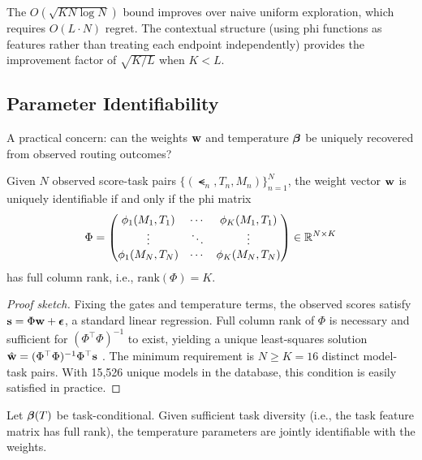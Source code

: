 \begin{remark}
The $O(\sqrt{KN\log N})$ bound improves over naive uniform exploration, which requires $O(L \cdot N)$ regret. The contextual structure (using phi functions as features rather than treating each endpoint independently) provides the improvement factor of $\sqrt{K/L}$ when $K < L$.
\end{remark}

\subsection{Parameter Identifiability}

A practical concern: can the weights $\mathbf{w}$ and temperature $\boldsymbol{\beta}$ be uniquely recovered from observed routing outcomes?

\begin{theorem}
\label{thm:weight_id}
Given $N$ observed score-task pairs $\{(\smt_n, T_n, M_n)\}_{n=1}^N$, the weight vector $\mathbf{w}$ is uniquely identifiable if and only if the phi matrix
\[
\Phi = \begin{pmatrix}
\phi_1(M_1, T_1) & \cdots & \phi_K(M_1, T_1) \\
\vdots & \ddots & \vdots \\
\phi_1(M_N, T_N) & \cdots & \phi_K(M_N, T_N)
\end{pmatrix} \in \mathbb{R}^{N \times K}
\]
has full column rank, i.e., $\text{rank}(\Phi) = K$.
\end{theorem}

\begin{proof}[Proof sketch]
Fixing the gates and temperature terms, the observed scores satisfy $\mathbf{s} = \Phi \mathbf{w} + \boldsymbol{\epsilon}$, a standard linear regression. Full column rank of $\Phi$ is necessary and sufficient for $(\Phi^{\top}\Phi)^{-1}$ to exist, yielding a unique least-squares solution $\hat{\mathbf{w}} = (\Phi^{\top}\Phi)^{-1}\Phi^{\top}\mathbf{s}$ \citep{walter1997identification}. The minimum requirement is $N \geq K = 16$ distinct model-task pairs. With 15,526 unique models in the database, this condition is easily satisfied in practice.
\end{proof}

\begin{theorem}
\label{thm:beta_id}
Let $\boldsymbol{\beta}(T)$ be task-conditional. Given sufficient task diversity (i.e., the task feature matrix has full rank), the temperature parameters are jointly identifiable with the weights.
\end{theorem}

